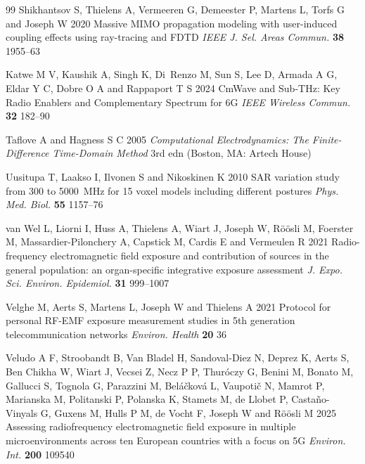 \documentclass{iopjournal}
\begin{document}
\begin{thebibliography}{99}
Shikhantsov S, Thielens A, Vermeeren G, Demeester P, Martens L, Torfs G and Joseph W 2020 Massive MIMO propagation modeling with user-induced coupling effects using ray-tracing and FDTD \emph{IEEE J. Sel. Areas Commun.} \textbf{38} 1955--63

Katwe M V, Kaushik A, Singh K, Di~Renzo M, Sun S, Lee D, Armada A G, Eldar Y C, Dobre O A and Rappaport T S 2024 CmWave and Sub-THz: Key Radio Enablers and Complementary Spectrum for 6G \emph{IEEE Wireless Commun.} \textbf{32} 182--90

Taflove A and Hagness S C 2005 \emph{Computational Electrodynamics: The Finite-Difference Time-Domain Method} 3rd edn (Boston, MA: Artech House)

Uusitupa T, Laakso I, Ilvonen S and Nikoskinen K 2010 SAR variation study from 300 to 5000~MHz for 15 voxel models including different postures \emph{Phys. Med. Biol.} \textbf{55} 1157--76

van Wel L, Liorni I, Huss A, Thielens A, Wiart J, Joseph W, R\"{o}\"{o}sli M, Foerster M, Massardier-Pilonchery A, Capstick M, Cardis E and Vermeulen R 2021 Radio-frequency electromagnetic field exposure and contribution of sources in the general population: an organ-specific integrative exposure assessment \emph{J. Expo. Sci. Environ. Epidemiol.} \textbf{31} 999--1007

Velghe M, Aerts S, Martens L, Joseph W and Thielens A 2021 Protocol for personal RF-EMF exposure measurement studies in 5th generation telecommunication networks \emph{Environ. Health} \textbf{20} 36

Veludo A F, Stroobandt B, Van Bladel H, Sandoval-Diez N, Deprez K, Aerts S, Ben Chikha W, Wiart J, Vecsei Z, Necz P P, Thur\'{o}czy G, Benini M, Bonato M, Gallucci S, Tognola G, Parazzini M, Bel\'{a}\v{c}kov\'{a} L, Vaupoti\v{c} N, Mamrot P, Marianska M, Politanski P, Polanska K, Stamets M, de Llobet P, Casta\~{n}o-Vinyals G, Guxens M, Hulls P M, de Vocht F, Joseph W and R\"{o}\"{o}sli M 2025 Assessing radiofrequency electromagnetic field exposure in multiple microenvironments across ten European countries with a focus on 5G \emph{Environ. Int.} \textbf{200} 109540


\end{thebibliography}
\end{document}
